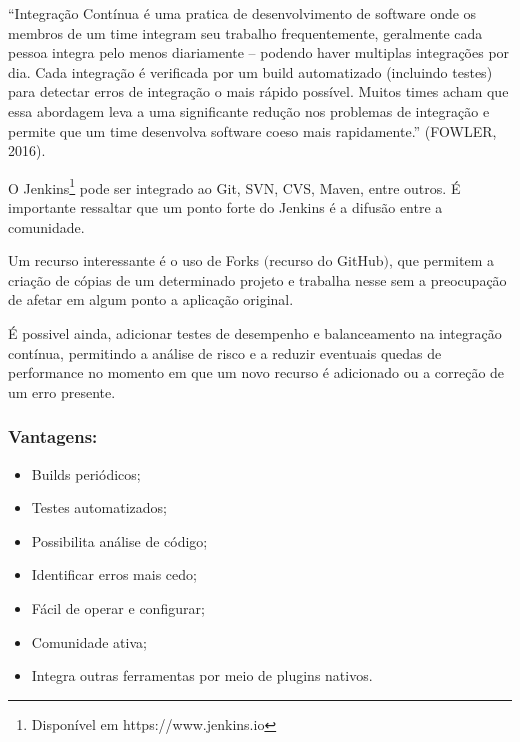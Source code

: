 			\begin{flushright}
	\begin{minipage}{0.75\textwidth}
		\normalsize “Integração Contínua é uma pratica de desenvolvimento de software onde os membros de um time integram seu trabalho frequentemente, geralmente cada pessoa integra pelo menos diariamente – podendo haver multiplas integrações por dia. Cada integração é verificada por um build automatizado (incluindo testes) para detectar erros de integração o mais rápido possível. Muitos times acham que essa abordagem leva a uma significante redução nos problemas de integração e permite que um time desenvolva software coeso mais rapidamente.” (FOWLER, 2016). 
	\end{minipage}
\end{flushright}

O Jenkins\footnote{Disponível em https://www.jenkins.io} pode ser integrado ao Git, SVN, CVS, Maven, entre outros. É importante ressaltar que um ponto forte do Jenkins é a difusão entre a comunidade.

Um recurso interessante é o uso de Forks $($recurso do GitHub$)$, que permitem a criação de cópias de um determinado projeto e trabalha nesse sem a preocupação de afetar em algum ponto a aplicação original.

É possivel ainda, adicionar testes de desempenho e balanceamento na integração contínua, permitindo a análise de risco e a reduzir eventuais quedas de performance no momento em que um novo recurso é adicionado ou a correção de um erro presente.

\subsubsection{Vantagens:}
\begin{itemize}
\item Builds periódicos;
\item Testes automatizados;
\item Possibilita análise de código;
\item Identificar erros mais cedo;
\item Fácil de operar e configurar;
\item Comunidade ativa;
\item Integra outras ferramentas por meio de plugins nativos.
\end{itemize}






